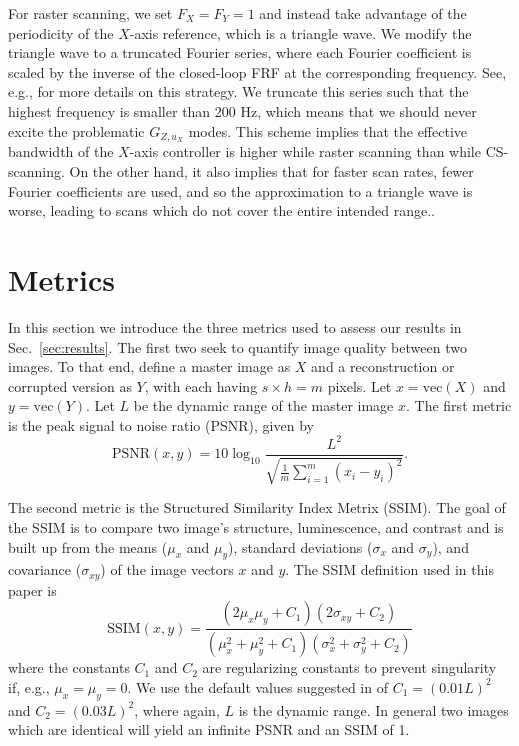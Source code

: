\documentclass[journal]{IEEEtran}
\begin{document}
For raster scanning, we set $F_X=F_Y=1$ and instead take advantage of
the periodicity of the $X$-axis reference, which is a triangle wave.
We modify the triangle wave to a truncated Fourier series, where each
Fourier coefficient is scaled by the inverse of the closed-loop FRF at
the corresponding frequency. See, e.g., \cite{clayton_review_2009} for
more details on this strategy. We truncate this series such that the
highest frequency is smaller than 200 Hz, which means that we should
never excite the problematic $G_{Z,u_X}$ modes. This scheme implies
that the effective bandwidth of the $X$-axis controller is higher
while raster scanning than while CS-scanning. On the other hand, it
also implies that for faster scan rates, fewer Fourier
coefficients are used, and so the approximation to a triangle wave is
worse, leading to scans which do not cover the entire intended range..

\section{Metrics}\label{sec:rdi}
In this section we introduce the three metrics used to assess our
results in Sec.~\ref{sec:results}. The first two seek to quantify image quality between two images.
To that end, define a master image as $X$ and a reconstruction or corrupted version
as $Y$, with each having $s\times h=m$ pixels. Let $x=\textrm{vec}(X)$
and $y=\textrm{vec}(Y)$. Let $L$ be the dynamic range of the master
image $x$. The first metric is the peak signal to noise ratio (PSNR), given by
\begin{equation*}
  \text{PSNR}(x,y) = 10\log_{10}\frac{L^2}
  {\sqrt{\frac{1}{m} \sum_{i=1}^{m}( x_{i} - y_{i})^2 }}.
\end{equation*}

The second metric is the Structured Similarity Index Metrix (SSIM).
The goal of the SSIM is to compare two image's structure,
luminescence, and contrast and is built up from the means ($\mu_x$ and
$\mu_y$), standard deviations ($\sigma_x$ and $\sigma_y$), and
covariance ($\sigma_{xy}$) of the image vectors $x$ and $y$. The SSIM definition used in this paper is
\begin{equation*}
  \text{SSIM}(x,y) = \frac{(2\mu_x\mu_y + C_1)(2\sigma_{xy}+C_2)}
  {(\mu_x^2 + \mu_y^2 + C_1)(\sigma_x^2 + \sigma_y^2 + C_2)}
\end{equation*}
where the constants $C_1$ and $C_2$ are regularizing constants to
prevent singularity if, e.g., $\mu_x=\mu_y=0$. We use the default
values suggested in \cite{wang_image_2004} of $C_1=(0.01L)^2$ and
${C_2=(0.03L)^2}$, where again, $L$ is the dynamic range. In general
two images which are identical will yield an infinite PSNR and an SSIM
of 1.
\end{document}
